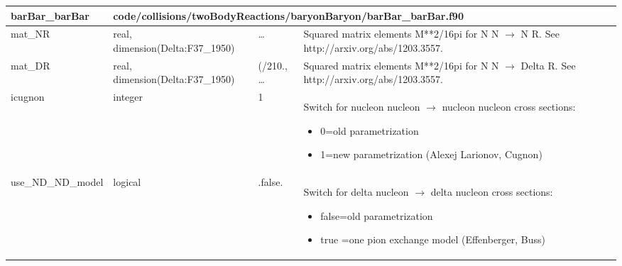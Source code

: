 \documentclass{article}
\begin{document}
\begin{longtable}{llll}
\toprule
\textbf{\large{barBar\_barBar}} & \multicolumn{3}{l}{\footnotesize{code/collisions/twoBodyReactions/baryonBaryon/barBar\_barBar.f90}}\\*
\midrule
\endfirsthead
\midrule
\endhead
mat\_NR & \begin{minipage}[t]{2cm}real, dimension(Delta:F37\_1950)\end{minipage} & \begin{minipage}[t]{2cm}\dots\end{minipage} & \begin{minipage}[t]{12cm}Squared matrix elements M**2/16pi for N N $\rightarrow$ N R. See http://arxiv.org/abs/1203.3557.\end{minipage}\\*
\midrule
mat\_DR & \begin{minipage}[t]{2cm}real, dimension(Delta:F37\_1950)\end{minipage} & \begin{minipage}[t]{2cm}(/210., \dots\end{minipage} & \begin{minipage}[t]{12cm}Squared matrix elements M**2/16pi for N N $\rightarrow$ Delta R. See http://arxiv.org/abs/1203.3557.\end{minipage}\\*
\midrule
icugnon & \begin{minipage}[t]{2cm}integer\end{minipage} & \begin{minipage}[t]{2cm}1\end{minipage} & \begin{minipage}[t]{12cm}Switch for nucleon nucleon $\rightarrow$ nucleon nucleon cross sections:\begin{itemize}\leftmargin0em\itemindent0pt\item 0=old parametrization\item 1=new parametrization (Alexej Larionov, Cugnon)\end{itemize}\end{minipage}\\*
\midrule
use\_ND\_ND\_model & \begin{minipage}[t]{2cm}logical\end{minipage} & \begin{minipage}[t]{2cm}.false.\end{minipage} & \begin{minipage}[t]{12cm}Switch for delta nucleon $\rightarrow$ delta nucleon cross sections:\begin{itemize}\leftmargin0em\itemindent0pt\item false=old parametrization\item true =one pion exchange model (Effenberger, Buss)\end{itemize}\end{minipage}\\*

\end{longtable}
\end{document}
